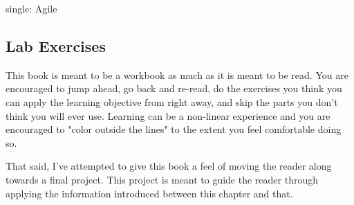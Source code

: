 single: Agile

\subsection{Lab Exercises}
\justify
This book is meant to be a workbook as much as it is meant to be read. You are encouraged to jump ahead, go back and re-read, do the exercises you think you can apply the learning objective from right away, and skip the parts you don't think you will ever use. Learning can be a non-linear experience and you are encouraged to "color outside the lines" to the extent you feel comfortable doing so.

\justify
That said, I've attempted to give this book a feel of moving the reader along towards a final project. This project is meant to guide the reader through applying the information introduced between this chapter and that.
